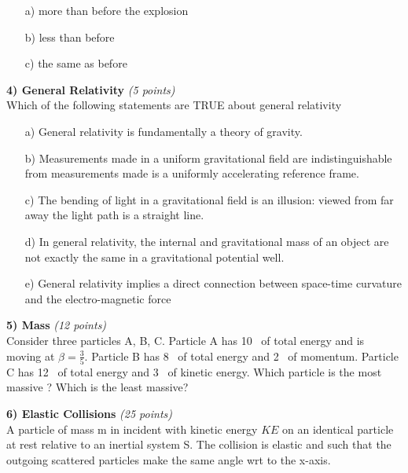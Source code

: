 {\begin{itemize}
\item[a)] more than before the explosion
\item[b)] less than before
\item[c)] the same as before
\end{itemize}


\clearpage

\textbf{4) General Relativity }\hfill \textit{(5 points)}\\
Which of the following statements are TRUE about general relativity
\begin{itemize}
\item[a)] General relativity is fundamentally a theory of gravity. 
\item[b)] Measurements made in a uniform gravitational field are indistinguishable from measurements made is a uniformly accelerating reference frame.
\item[c)] The bending of light in a gravitational field is an illusion: viewed from far away the light path is a straight line.
\item[d)] In general relativity, the internal and gravitational mass of an object are not exactly the same in a gravitational potential well.
\item[e)] General relativity implies a direct connection between space-time curvature and the electro-magnetic force
\end{itemize}

\vspace{0.5in}

\textbf{5) Mass }\hfill \textit{(12 points)}\\

Consider three particles A, B, C.
Particle A has 10 \GeV\ of total energy and is moving at $\beta = \frac{3}{5}$.
Particle B has 8 \GeV\ of total energy and 2 \GeV\ of momentum.
Particle C has 12 \GeV\ of total energy and 3 \GeV\ of kinetic energy.
Which particle is the most massive ?
Which is the least massive?


\vspace{0.1in}

\clearpage

\textbf{6) Elastic Collisions }\hfill \textit{(25 points)}\\
A particle of mass m in incident with kinetic energy $KE$ on an identical particle at rest relative to an inertial system S.
The collision is elastic and such that the outgoing scattered particles make the same angle wrt to the x-axis.  


}
